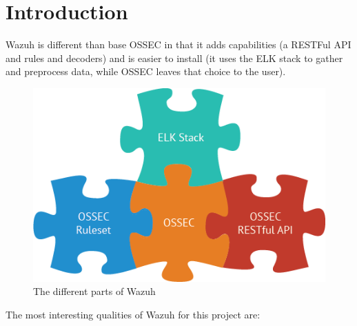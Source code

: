 
\section{Introduction}

Wazuh is different than base OSSEC in that it adds capabilities (a RESTFul API and rules and decoders) and is easier to install (it uses the ELK stack to gather and preprocess data, while OSSEC leaves that choice to the user).
\begin{figure}[H]
  \centering
	\includegraphics[width=.6\textwidth]{figuras/wazuh_stack.png}
	\caption{The different parts of Wazuh\cite{wazuh_stack}}
\end{figure}
\linej
The most interesting qualities of Wazuh for this project are\cite{wazuh_index}\cite{wazuh_documentation}: %
